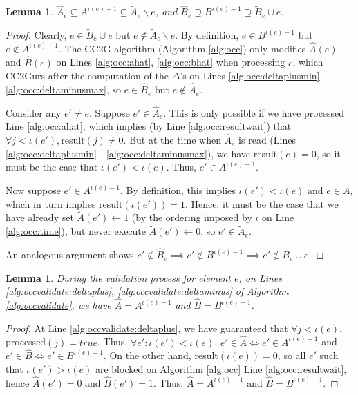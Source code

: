 \documentclass{article} %
\newcommand{\occ}{CC2G}
\newtheorem{lem}[thm]{Lemma}
\begin{document}
\begin{lem}\label{lem:occ:set_bound}
$\hat{A}_e \subseteq A^{\iota(e)-1} \subseteq \tilde{A}_e \backslash e$, and $\hat{B}_e \supseteq B^{\iota(e)-1} \supseteq \tilde{B}_e \cup e$.
\end{lem}
\begin{proof}
Clearly, $e \in \tilde{B}_e\cup e$ but $e\not\in \tilde{A}_e\backslash e$.
By definition, $e \in B^{\iota(e)-1}$ but $e\not\in A^{\iota(e)-1}$.
The \occ{} algorithm (Algorithm \ref{alg:occ}) only modifies $\hat{A}(e)$ and $\hat{B}(e)$ on Lines \ref{alg:occ:ahat}, \ref{alg:occ:bhat} when processing $e$, which \occ{}urs after the computation of the $\Delta$'s on Lines \ref{alg:occ:deltaplusmin} - \ref{alg:occ:deltaminusmax}, so $e \in \hat{B}_e$ but $e\not\in \hat{A}_e$.

Consider any $e'\neq e$.
Suppose $e' \in \hat{A}_e$.
This is only possible if we have processed Line \ref{alg:occ:ahat}, which implies (by Line \ref{alg:occ:resultwait}) that $\forall j < \iota(e'), \text{result}(j) \neq 0$.
But at the time when $\hat{A}_e$ is read (Lines \ref{alg:occ:deltaplusmin} - \ref{alg:occ:deltaminusmax}), we have result$(e)=0$, so it must be the case that $\iota(e') < \iota(e)$.
Thus, $e' \in A^{\iota(e)-1}$.

Now suppose $e' \in A^{\iota(e)-1}$.
By definition, this implies $\iota(e') < \iota(e)$ and $e \in A$, which in turn implies result$(\iota(e'))=1$.
Hence, it must be the case that we have already set $\tilde{A}(e') \leftarrow 1$ (by the ordering imposed by $\iota$ on Line \ref{alg:occ:time}), but never execute $\tilde{A}(e') \leftarrow 0$, so $e' \in \tilde{A}_e$.

An analogous argument shows $e' \not\in \hat{B}_e \implies e' \not\in B^{\iota(e)-1} \implies e' \not\in\tilde{B}_e \cup e$.
\end{proof}

\begin{lem}
During the validation process for element $e$, on Lines \ref{alg:occvalidate:deltaplus}, \ref{alg:occvalidate:deltaminus} of Algorithm \ref{alg:occvalidate}, we have $\hat{A} = A^{\iota(e)-1}$ and $\hat{B} = B^{\iota(e)-1}$.
\end{lem}
\begin{proof}
At Line \ref{alg:occvalidate:deltaplus}, we have guaranteed that $\forall j < \iota(e)$, processed$(j) = true$.
Thus, $\forall e': \iota(e') < \iota(e)$, $e' \in \hat{A} \iff e' \in A^{\iota(e)-1}$ and $e' \in \hat{B} \iff e' \in B^{\iota(e)-1}$.
On the other hand, result$(\iota(e)) = 0$, so all $e'$ such that $\iota(e') > \iota(e)$ are blocked on Algorithm \ref{alg:occ} Line \ref{alg:occ:resultwait}, hence $\hat{A}(e') = 0$ and $\hat{B}(e') = 1$.
Thus, $\hat{A} = A^{\iota(e)-1}$ and $\hat{B} = B^{\iota(e)-1}$.
\end{proof}
\end{document}

